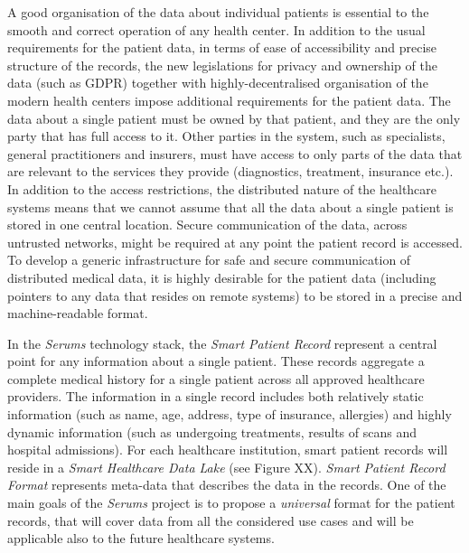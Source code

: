 
\noindent
A good organisation of the data about individual patients is essential to the smooth and correct operation of any health center. In addition to the usual requirements for the patient data, in terms of ease of accessibility and precise structure of the records, the new legislations for privacy and ownership of the data (such as GDPR) together with highly-decentralised organisation of the modern health centers impose additional requirements for the patient data. The data about a single patient must be owned by that patient, and they are the only party that has full access to it. Other parties in the system, such as specialists, general practitioners and insurers, must have access to only parts of the data that are relevant to the services they provide (diagnostics, treatment, insurance etc.). In addition to the access restrictions, the distributed nature of the healthcare systems means that we cannot assume that all the data about a single patient is stored in one central location. Secure communication of the data, across untrusted networks, might be required at any point the patient record is accessed. To develop a generic infrastructure for safe and secure communication of distributed medical data, it is highly desirable for the patient data (including pointers to any data that resides on remote systems) to be stored in a precise and machine-readable format.

In the \emph{Serums} technology stack, the \emph{Smart Patient Record} represent a central point for any information about a single patient. These records aggregate a complete medical history for a single patient across all approved healthcare providers. The information in a single record includes both relatively static information (such as name, age, address, type of insurance, allergies) and highly dynamic information (such as undergoing treatments, results of scans and hospital admissions). For each healthcare institution, smart patient records will reside in a \emph{Smart Healthcare Data Lake} (see Figure XX). \emph{Smart Patient Record Format} represents meta-data that describes the data in the records. One of the main goals of the \emph{Serums} project is to propose a \emph{universal} format for the patient records, that will cover data from all the considered use cases and will be applicable also to the future healthcare systems.

\noindent
